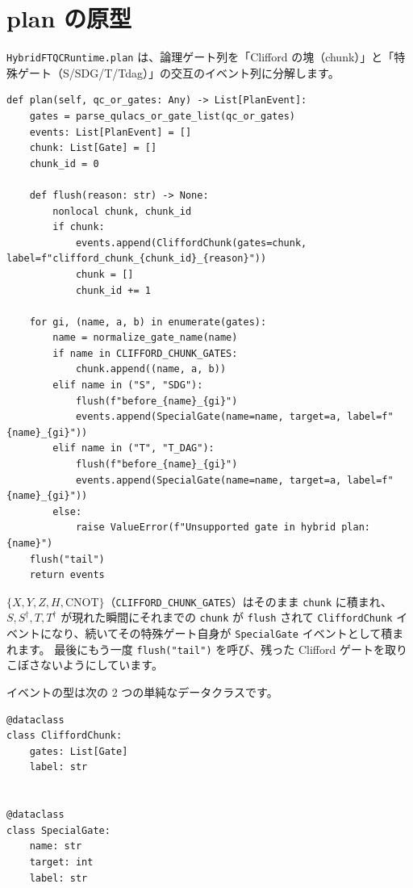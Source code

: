\section{plan の原型}\label{sec:plan_proto}

\texttt{HybridFTQCRuntime.plan} は、論理ゲート列を「Clifford の塊（chunk）」と「特殊ゲート（S/SDG/T/Tdag）」の交互のイベント列に分解します。

\begin{lstlisting}[caption={src/stages/01\_mpp/src/ftqc/hybrid\_ftqc\_runtime.py の plan メソッド（行596--622）}]
def plan(self, qc_or_gates: Any) -> List[PlanEvent]:
    gates = parse_qulacs_or_gate_list(qc_or_gates)
    events: List[PlanEvent] = []
    chunk: List[Gate] = []
    chunk_id = 0

    def flush(reason: str) -> None:
        nonlocal chunk, chunk_id
        if chunk:
            events.append(CliffordChunk(gates=chunk, label=f"clifford_chunk_{chunk_id}_{reason}"))
            chunk = []
            chunk_id += 1

    for gi, (name, a, b) in enumerate(gates):
        name = normalize_gate_name(name)
        if name in CLIFFORD_CHUNK_GATES:
            chunk.append((name, a, b))
        elif name in ("S", "SDG"):
            flush(f"before_{name}_{gi}")
            events.append(SpecialGate(name=name, target=a, label=f"{name}_{gi}"))
        elif name in ("T", "T_DAG"):
            flush(f"before_{name}_{gi}")
            events.append(SpecialGate(name=name, target=a, label=f"{name}_{gi}"))
        else:
            raise ValueError(f"Unsupported gate in hybrid plan: {name}")
    flush("tail")
    return events
\end{lstlisting}

$\{X,Y,Z,H,\mathrm{CNOT}\}$（\texttt{CLIFFORD\_CHUNK\_GATES}）はそのまま \texttt{chunk} に積まれ、$S,S^\dagger,T,T^\dagger$ が現れた瞬間にそれまでの \texttt{chunk} が \texttt{flush} されて \texttt{CliffordChunk} イベントになり、続いてその特殊ゲート自身が \texttt{SpecialGate} イベントとして積まれます。
最後にもう一度 \texttt{flush("tail")} を呼び、残った Clifford ゲートを取りこぼさないようにしています。

イベントの型は次の 2 つの単純なデータクラスです。

\begin{lstlisting}[caption={src/stages/01\_mpp/src/ftqc/hybrid\_ftqc\_runtime.py のイベント型（行365--376）}]
@dataclass
class CliffordChunk:
    gates: List[Gate]
    label: str


@dataclass
class SpecialGate:
    name: str
    target: int
    label: str
\end{lstlisting}

